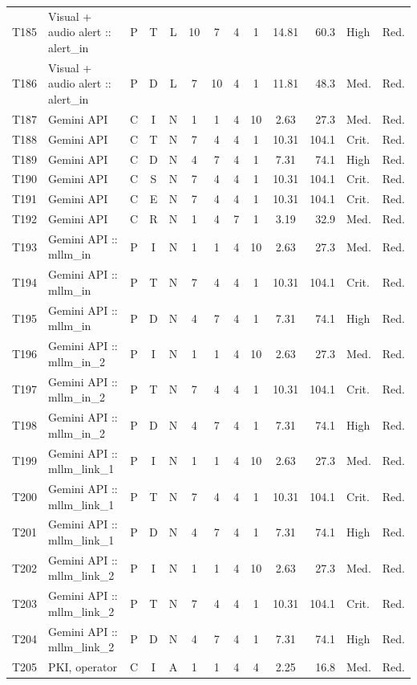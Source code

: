 \documentclass[9pt]{extarticle}
\begin{document}
\begin{longtable}{l>{\raggedright\arraybackslash}p{6.3cm}ccccccccrll}
T185 & Visual + audio alert :: alert\_in & P & T & L & 10 & 7 & 4 & 1 & 14.81 & 60.3 & High & Red. \\
T186 & Visual + audio alert :: alert\_in & P & D & L & 7 & 10 & 4 & 1 & 11.81 & 48.3 & Med. & Red. \\
T187 & Gemini API & C & I & N & 1 & 1 & 4 & 10 & 2.63 & 27.3 & Med. & Red. \\
T188 & Gemini API & C & T & N & 7 & 4 & 4 & 1 & 10.31 & 104.1 & Crit. & Red. \\
T189 & Gemini API & C & D & N & 4 & 7 & 4 & 1 & 7.31 & 74.1 & High & Red. \\
T190 & Gemini API & C & S & N & 7 & 4 & 4 & 1 & 10.31 & 104.1 & Crit. & Red. \\
T191 & Gemini API & C & E & N & 7 & 4 & 4 & 1 & 10.31 & 104.1 & Crit. & Red. \\
T192 & Gemini API & C & R & N & 1 & 4 & 7 & 1 & 3.19 & 32.9 & Med. & Red. \\
T193 & Gemini API :: mllm\_in & P & I & N & 1 & 1 & 4 & 10 & 2.63 & 27.3 & Med. & Red. \\
T194 & Gemini API :: mllm\_in & P & T & N & 7 & 4 & 4 & 1 & 10.31 & 104.1 & Crit. & Red. \\
T195 & Gemini API :: mllm\_in & P & D & N & 4 & 7 & 4 & 1 & 7.31 & 74.1 & High & Red. \\
T196 & Gemini API :: mllm\_in\_2 & P & I & N & 1 & 1 & 4 & 10 & 2.63 & 27.3 & Med. & Red. \\
T197 & Gemini API :: mllm\_in\_2 & P & T & N & 7 & 4 & 4 & 1 & 10.31 & 104.1 & Crit. & Red. \\
T198 & Gemini API :: mllm\_in\_2 & P & D & N & 4 & 7 & 4 & 1 & 7.31 & 74.1 & High & Red. \\
T199 & Gemini API :: mllm\_link\_1 & P & I & N & 1 & 1 & 4 & 10 & 2.63 & 27.3 & Med. & Red. \\
T200 & Gemini API :: mllm\_link\_1 & P & T & N & 7 & 4 & 4 & 1 & 10.31 & 104.1 & Crit. & Red. \\
T201 & Gemini API :: mllm\_link\_1 & P & D & N & 4 & 7 & 4 & 1 & 7.31 & 74.1 & High & Red. \\
T202 & Gemini API :: mllm\_link\_2 & P & I & N & 1 & 1 & 4 & 10 & 2.63 & 27.3 & Med. & Red. \\
T203 & Gemini API :: mllm\_link\_2 & P & T & N & 7 & 4 & 4 & 1 & 10.31 & 104.1 & Crit. & Red. \\
T204 & Gemini API :: mllm\_link\_2 & P & D & N & 4 & 7 & 4 & 1 & 7.31 & 74.1 & High & Red. \\
T205 & PKI, operator & C & I & A & 1 & 1 & 4 & 4 & 2.25 & 16.8 & Med. & Red. \\

\end{longtable}
\end{document}
